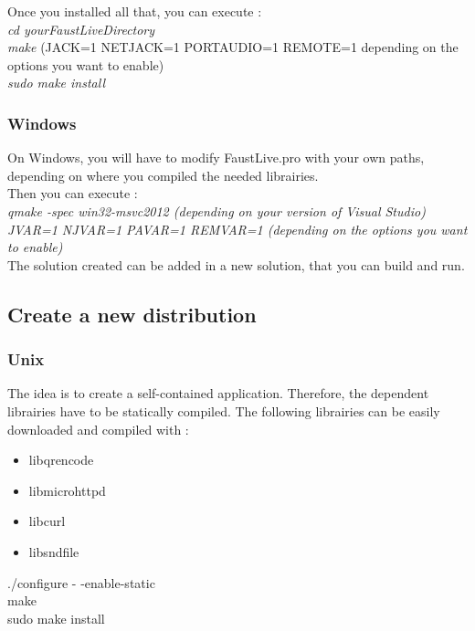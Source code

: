 \documentclass[a4paper]{article}
\begin{document}
{Once you installed all that, you can execute : \\
{\it cd yourFaustLiveDirectory} \\
{\it make} (JACK=1 NETJACK=1 PORTAUDIO=1 REMOTE=1 depending on the options you want to enable)\\
{\it sudo make install} 

\subsubsection{Windows}

On Windows, you will have to modify FaustLive.pro with your own paths, depending on where you compiled the needed librairies. \\

Then you can execute : \\
{\it qmake -spec win32-msvc2012 (depending on your version of Visual Studio) JVAR=1 NJVAR=1 PAVAR=1 REMVAR=1 (depending on the options you want to enable)} \\
The solution created can be added in a new solution, that you can build and run. 

\subsection{Create a new distribution}

\subsubsection{Unix}

The idea is to create a self-contained application. Therefore, the dependent librairies have to be statically compiled. The following librairies can be easily downloaded and compiled with : 

\begin{multicols}{2}

\begin{itemize}
\item libqrencode
\item libmicrohttpd
\item libcurl
\item libsndfile
\end{itemize}


./configure - -enable-static \\
make \\
sudo make install \\
\end{multicols}

}
\end{document}

